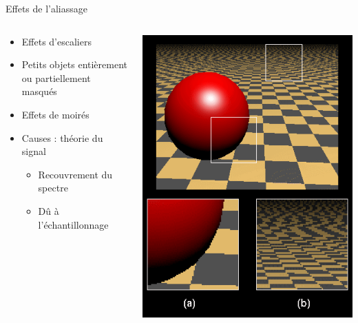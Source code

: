 \begin{frame}[t]{Effets de l'aliassage}
  \begin{columns}
    \begin{column}{.49\textwidth}
      \begin{itemize}
        \item Effets d'escaliers
        \item Petits objets entièrement ou partiellement masqués
        \item Effets de moirés
        \item Causes : théorie du signal
        \begin{itemize}
          \item Recouvrement du spectre
          \item Dû à l'échantillonnage
        \end{itemize}
      \end{itemize}
    \end{column}
    \begin{column}{.49\textwidth}
      \includegraphics[width=.9\columnwidth]{figs/alias2.png}
    \end{column}
  \end{columns}
\end{frame}

